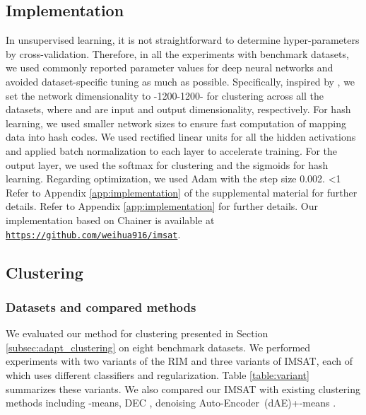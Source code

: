 \documentclass{article}
\theoremstyle{plain}
\newcounter{long}
\begin{document}
\subsection{Implementation}
In unsupervised learning, it is not straightforward to determine hyper-parameters by cross-validation. 
Therefore, in all the experiments with benchmark datasets, we used commonly reported parameter values for deep neural networks and avoided dataset-specific tuning as much as possible.
Specifically, inspired by \citet{hinton2012improving}, we set the network dimensionality to -1200-1200- for clustering across all the datasets, where  and  are input and output dimensionality, respectively. 
For hash learning, we used smaller network sizes to ensure fast computation of mapping data into hash codes.
We used rectified linear units \citep{jarrett2009best, nair2010rectified, glorot2011deep} for all the hidden activations and applied batch normalization \citep{ioffe2015batch} to each layer to accelerate training. 
For the output layer, we used the softmax for clustering and the sigmoids for hash learning. 
Regarding optimization, we used Adam \citep{kingma2014adam} with the step size 0.002.
\ifnum\value{long}<1
Refer to Appendix \ref{app:implementation} of the supplemental material for further details.
\else
Refer to Appendix \ref{app:implementation} for further details.
\fi
Our implementation based on Chainer \citep{tokui2015chainer} is available at {\tt \url{https://github.com/weihua916/imsat}}.

\subsection{Clustering} \label{subsec:clustering}
\subsubsection{Datasets and compared methods}
We evaluated our method for clustering presented in Section \ref{subsec:adapt_clustering} on eight benchmark datasets.
We performed experiments with two variants of the RIM and three variants of IMSAT, each of which uses different classifiers and regularization. 
Table \ref{table:variant} summarizes these variants.
We also compared our IMSAT with existing clustering methods including -means, DEC \citep{xie2016unsupervised}, denoising Auto-Encoder~(dAE)+-means \citep{xie2016unsupervised}. 
\end{document}

